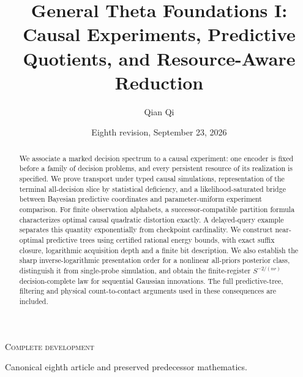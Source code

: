 
\newcommand{\Wone}{W_1}
\newcommand{\Del}{\Delta}
\newcommand{\emptyw}{\varnothing}
\newcommand{\osc}{\operatorname{osc}}
\newcommand{\diam}{\operatorname{diam}}
\newcommand{\Lipone}{\operatorname{Lip}_1}
\title[General Theta Foundations I]{General Theta Foundations I: Causal Experiments, Predictive Quotients, and Resource-Aware Reduction}
\author{Qian Qi}
\date{Eighth revision, September 23, 2026}

\begin{abstract}
We associate a marked decision spectrum to a causal experiment: one
encoder is fixed before a family of decision problems, and every
persistent resource of its realization is specified. We prove transport
under typed causal simulations, representation of the terminal
all-decision slice by statistical deficiency, and a likelihood-saturated
bridge between Bayesian predictive coordinates and parameter-uniform
experiment comparison. For finite observation alphabets, a
successor-compatible partition formula characterizes optimal causal
quadratic distortion exactly. A delayed-query example separates this
quantity exponentially from checkpoint cardinality. We construct
near-optimal predictive trees using certified rational energy bounds,
with exact suffix closure, logarithmic acquisition depth and a finite
bit description. We also establish the sharp inverse-logarithmic
presentation order for a nonlinear all-priors posterior class, distinguish
it from single-probe simulation, and obtain the finite-register
$S^{-2/(nr)}$ decision-complete law for sequential Gaussian innovations.
The full predictive-tree, filtering and physical count-to-contact
arguments used in these consequences are included.
\end{abstract}
\maketitle
\ifcomplete
\begin{center}\small\textsc{Complete development}\par
Canonical eighth article and preserved predecessor mathematics.
\end{center}
\fi
\tableofcontents
